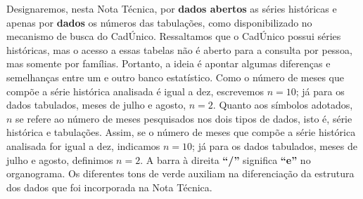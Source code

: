 \documentclass[12pt]{article}
\begin{document}
Designaremos, nesta Nota Técnica, por \textbf{dados abertos} as séries históricas e apenas por \textbf{dados} os números das tabulações, como disponibilizado no mecanismo de busca do CadÚnico. Ressaltamos que o CadÚnico possui séries históricas, mas o acesso a essas tabelas não é aberto para a consulta por pessoa, mas somente por famílias. Portanto, a ideia é apontar algumas diferenças e semelhanças entre um e outro banco estatístico. Como o número de meses que compõe a série histórica analisada é igual a dez, escrevemos $n = 10$; já para os dados tabulados, meses de julho e agosto, $n = 2$. Quanto aos símbolos adotados,  $n$ se refere ao número de meses pesquisados nos dois tipos de dados, isto é, série histórica e tabulações. Assim, se o número de meses que compõe a série histórica analisada for igual a dez, indicamos $n = 10$; já para os dados tabulados, meses de julho e agosto, definimos $n = 2$. A barra à direita \textbf{``/”} significa \textbf{``e”} no organograma. Os diferentes tons de verde auxiliam na diferenciação da estrutura dos dados que foi incorporada na Nota Técnica.\\

\vspace{1cm}
\end{document}
